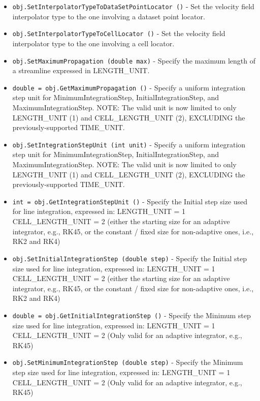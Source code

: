 \begin{itemize}
\item  \verb|obj.SetInterpolatorTypeToDataSetPointLocator ()| -  Set the velocity field interpolator type to the one involving
 a dataset point locator.

\item  \verb|obj.SetInterpolatorTypeToCellLocator ()| -  Set the velocity field interpolator type to the one involving
 a cell locator.

\item  \verb|obj.SetMaximumPropagation (double max)| -  Specify the maximum length of a streamline expressed in LENGTH\_UNIT.

\item  \verb|double = obj.GetMaximumPropagation ()| -  Specify a uniform integration step unit for MinimumIntegrationStep, 
 InitialIntegrationStep, and MaximumIntegrationStep. NOTE: The valid
 unit is now limited to only LENGTH\_UNIT (1) and CELL\_LENGTH\_UNIT (2),
 EXCLUDING the previously-supported TIME\_UNIT.  

\item  \verb|obj.SetIntegrationStepUnit (int unit)| -  Specify a uniform integration step unit for MinimumIntegrationStep, 
 InitialIntegrationStep, and MaximumIntegrationStep. NOTE: The valid
 unit is now limited to only LENGTH\_UNIT (1) and CELL\_LENGTH\_UNIT (2),
 EXCLUDING the previously-supported TIME\_UNIT.  

\item  \verb|int = obj.GetIntegrationStepUnit ()| -  Specify the Initial step size used for line integration, expressed in:
 LENGTH\_UNIT      = 1
 CELL\_LENGTH\_UNIT = 2
 (either the starting size for an adaptive integrator, e.g., RK45,
 or the constant / fixed size for non-adaptive ones, i.e., RK2 and RK4)

\item  \verb|obj.SetInitialIntegrationStep (double step)| -  Specify the Initial step size used for line integration, expressed in:
 LENGTH\_UNIT      = 1
 CELL\_LENGTH\_UNIT = 2
 (either the starting size for an adaptive integrator, e.g., RK45,
 or the constant / fixed size for non-adaptive ones, i.e., RK2 and RK4)

\item  \verb|double = obj.GetInitialIntegrationStep ()| -  Specify the Minimum step size used for line integration, expressed in:
 LENGTH\_UNIT      = 1
 CELL\_LENGTH\_UNIT = 2
 (Only valid for an adaptive integrator, e.g., RK45)

\item  \verb|obj.SetMinimumIntegrationStep (double step)| -  Specify the Minimum step size used for line integration, expressed in:
 LENGTH\_UNIT      = 1
 CELL\_LENGTH\_UNIT = 2
 (Only valid for an adaptive integrator, e.g., RK45)


\end{itemize}
